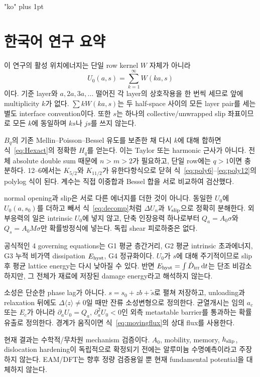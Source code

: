 \documentclass[11pt,letterpaper]{article}
\newenvironment{koreantranslation}{\koreanfont\XeTeXlinebreaklocale "ko"\XeTeXlinebreakskip=0pt plus 1pt}{}
\newcommand{\dd}{\,\mathrm d}
\begin{document}


\clearpage
\begin{koreantranslation}
\section*{\koreanfont 한국어 연구 요약}

이 연구의 활성 위치에너지는 단일 row kernel $W$ 자체가 아니라
\[
 U_0(a,s)=\sum_{k=1}^{\infty}W(ka,s)
\]
이다. 기준 layer와 $a,2a,3a,\ldots$ 떨어진 각 layer의 상호작용을 한 번씩
세므로 앞에 multiplicity $k$가 없다. $\sum kW(ka,s)$는 두 half-space 사이의
모든 layer pair를 세는 별도 interface convention이다. 또한 $s$는 하나의
collective/unwrapped slip 좌표이므로 모든 $k$에 동일하며 $ks$나 $js$를 쓰지
않는다.

$B_q$의 기존 Mellin--Poisson--Bessel 유도를 보존한 채 다시 $k$에 대해
합하면 식~\eqref{eq:Hexact}의 정확한 $H_q$를 얻는다. 이는 Taylor 또는
harmonic 근사가 아니다. 전체 absolute double sum 때문에 $n>m>2$가
필요하고, 단일 row에는 $q>1$이면 충분하다. 12--6에서는 $K_{5/2}$와
$K_{11/2}$가 유한다항식으로 닫혀 식~\eqref{eq:poly6}--\eqref{eq:poly12}의
polylog 식이 된다. 계수는 직접 이중합과 Bessel 합을 서로 비교하여 검산했다.

normal opening과 slip은 서로 다른 에너지를 더한 것이 아니다. 동일한 $U_0$에
$U_0(a,s_0)$를 더하고 빼서 식~\eqref{eq:decomp}처럼 $\Delta U_n$과
$V_{\rm slip}$으로 정확히 분해한다. 외부응력의 일은 intrinsic $U_0$에 넣지
않고, 단축 인장응력 하나로부터 $Q_a=A_0\sigma$와 $Q_s=A_0M\sigma$만
확률방정식에 넣는다. 독립 shear 피로하중은 없다.

공식적인 4 governing equations는 G1 평균 층간거리, G2 평균 intrinsic
초과에너지, G3 누적 비가역 dissipation $E_{\rm hyst}$, G4 정규화이다.
$U_0$가 $s$에 대해 주기적이므로 slip 후 평균 lattice energy는 다시 낮아질 수
있다. 반면 $E_{\rm hyst}=\int\dot D_{\rm irr}\dd t$는 단조 비감소하지만,
그 전체가 재료에 저장된 damage energy라고 해석하지 않는다.

소성은 단순한 phase lag가 아니다. $s=s_0+zb+\widetilde s$로 펼쳐 저장하고,
unloading과 relaxation 뒤에도 $\Delta\langle z\rangle\ne0$일 때만 잔류
소성변형으로 정의한다. 균열개시는 임의 $a_c$ 또는 $E_c$가 아니라
$\partial_aU_0=Q_a$, $\partial_a^2U_0<0$인 외측 metastable barrier를
통과하는 확률유출로 정의한다. 경계가 움직이면 식~\eqref{eq:movingflux}의
상대 flux를 사용한다.

현재 결과는 수학적/무차원 mechanism 검증이다. $A_0$, mobility, memory,
$h_{\rm slip}$, dislocation hardening이 독립적으로 확정되기 전에는 알루미늄
수명예측이라고 주장하지 않는다. EAM/DFT는 향후 정량 검증용일 뿐 현재
fundamental potential을 대체하지 않는다.


\end{koreantranslation}
\end{document}

